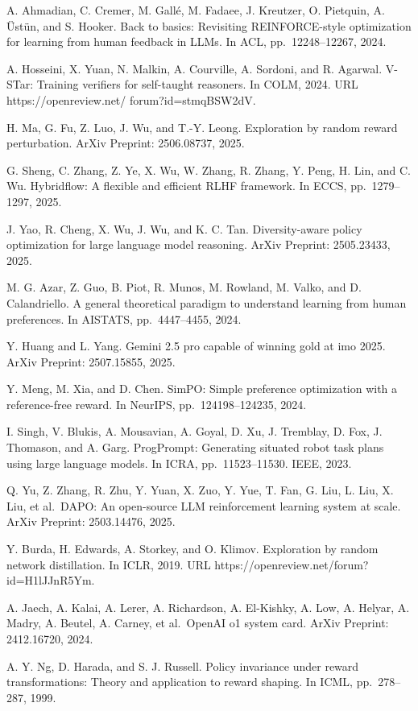 \documentclass[
  10
]{article}
\begin{document}
A. Ahmadian, C. Cremer, M. Gallé, M. Fadaee, J. Kreutzer, O. Pietquin,
A. Üstün, and S. Hooker. Back to basics: Revisiting REINFORCE-style
optimization for learning from human feedback in LLMs. In ACL,
pp.~12248--12267, 2024.

A. Hosseini, X. Yuan, N. Malkin, A. Courville, A. Sordoni, and R.
Agarwal. V-STar: Training verifiers for self-taught reasoners. In COLM,
2024. URL https://openreview.net/ forum?id=stmqBSW2dV.

H. Ma, G. Fu, Z. Luo, J. Wu, and T.-Y. Leong. Exploration by random
reward perturbation. ArXiv Preprint: 2506.08737, 2025.

G. Sheng, C. Zhang, Z. Ye, X. Wu, W. Zhang, R. Zhang, Y. Peng, H. Lin,
and C. Wu. Hybridflow: A flexible and efficient RLHF framework. In ECCS,
pp.~1279--1297, 2025.

J. Yao, R. Cheng, X. Wu, J. Wu, and K. C. Tan. Diversity-aware policy
optimization for large language model reasoning. ArXiv Preprint:
2505.23433, 2025.

M. G. Azar, Z. Guo, B. Piot, R. Munos, M. Rowland, M. Valko, and D.
Calandriello. A general theoretical paradigm to understand learning from
human preferences. In AISTATS, pp.~4447--4455, 2024.

Y. Huang and L. Yang. Gemini 2.5 pro capable of winning gold at imo
2025. ArXiv Preprint: 2507.15855, 2025.

Y. Meng, M. Xia, and D. Chen. SimPO: Simple preference optimization with
a reference-free reward. In NeurIPS, pp.~124198--124235, 2024.

I. Singh, V. Blukis, A. Mousavian, A. Goyal, D. Xu, J. Tremblay, D. Fox,
J. Thomason, and A. Garg. ProgPrompt: Generating situated robot task
plans using large language models. In ICRA, pp.~11523--11530. IEEE,
2023.

Q. Yu, Z. Zhang, R. Zhu, Y. Yuan, X. Zuo, Y. Yue, T. Fan, G. Liu, L.
Liu, X. Liu, et al.~DAPO: An open-source LLM reinforcement learning
system at scale. ArXiv Preprint: 2503.14476, 2025.

Y. Burda, H. Edwards, A. Storkey, and O. Klimov. Exploration by random
network distillation. In ICLR, 2019. URL
https://openreview.net/forum?id=H1lJJnR5Ym.

A. Jaech, A. Kalai, A. Lerer, A. Richardson, A. El-Kishky, A. Low, A.
Helyar, A. Madry, A. Beutel, A. Carney, et al.~OpenAI o1 system card.
ArXiv Preprint: 2412.16720, 2024.

A. Y. Ng, D. Harada, and S. J. Russell. Policy invariance under reward
transformations: Theory and application to reward shaping. In ICML,
pp.~278--287, 1999.
\end{document}
